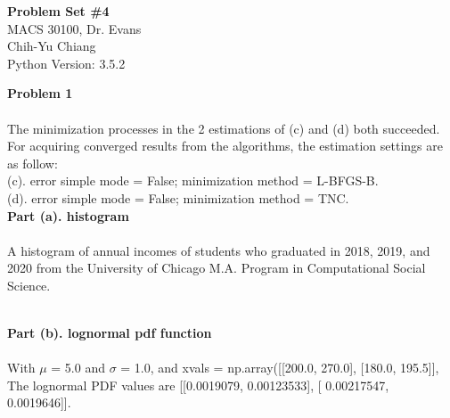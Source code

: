 \documentclass[letterpaper,12pt]{article}
\theoremstyle{definition}
\begin{document}
\begin{flushleft}
  \textbf{\large{Problem Set \#4}} \\
  MACS 30100, Dr. Evans \\
  Chih-Yu Chiang \\
  Python Version: 3.5.2
\end{flushleft}
\vspace{5mm}
\noindent\textbf{Problem 1} \\
\\
The minimization processes in the 2 estimations of (c) and (d) both succeeded.
For acquiring converged results from the algorithms, the estimation settings are as follow: \\
(c). error simple mode = False; minimization method = L-BFGS-B. \\
(d). error simple mode = False; minimization method = TNC. \\

\noindent\textbf{Part (a). histogram} \\
\\
A histogram of annual incomes of students who graduated in 2018, 2019, and 2020 from the University of Chicago M.A. Program in Computational Social Science. \\
\begin{figure}[htb]\centering\captionsetup{width=6.0in}
  \caption{\textbf{}}
\end{figure} \\

\noindent\textbf{Part (b). lognormal pdf function} \\
\\
With $\mu$ = 5.0 and $\sigma$ = 1.0, and xvals = np.array([[200.0, 270.0], [180.0, 195.5]], \\
The lognormal PDF values are [[0.0019079, 0.00123533], [ 0.00217547, 0.0019646]].
\\
\end{document}
